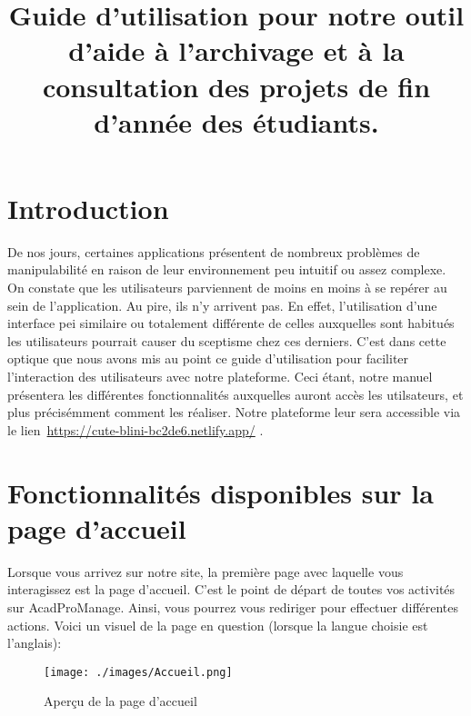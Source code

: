 \documentclass[12pt]{article}
\title{Guide d'utilisation pour notre outil d’aide à l’archivage et à la consultation des projets de fin d'année des étudiants.}
\begin{document}
\date{}

\maketitle
\clearpage

\tableofcontents
\clearpage

\listoffigures
\clearpage


\vfill
\newpage

{\fontsize{14}{16}\section*{Introduction}}
De nos jours, certaines applications présentent de nombreux problèmes de manipulabilité en raison de leur environnement peu intuitif ou assez complexe. On constate que les utilisateurs parviennent de moins en moins à se repérer au sein de l'application. Au pire, ils n'y arrivent pas. En effet, l'utilisation d'une interface pei similaire ou totalement différente de celles auxquelles sont habitués les utilisateurs pourrait causer du sceptisme chez ces derniers. C'est dans cette optique que nous avons mis au point ce guide d'utilisation pour faciliter l'interaction des utilisateurs avec notre plateforme. Ceci étant, notre manuel présentera les différentes fonctionnalités auxquelles auront accès les utilsateurs, et plus précisémment comment les réaliser. Notre plateforme leur sera accessible via le lien\, 
\url {https://cute-blini-bc2de6.netlify.app/} .
\setcounter{section}{0}
\newpage

\section{Fonctionnalités disponibles sur la page d'accueil}
Lorsque vous arrivez sur notre site, la première page avec laquelle vous interagissez est la page d'accueil. C'est le point de départ de toutes vos activités sur AcadProManage. Ainsi, vous pourrez vous rediriger pour effectuer différentes actions. Voici un visuel de la page en question (lorsque la langue choisie est l'anglais):
\smallskip
\begin{figure}[h!] 
    \centering
    \texttt{[image: ./images/Accueil.png]}
    \caption{Aperçu de la page d’accueil}
    \label{fig:Accueil}
\end{figure}
\end{document}
